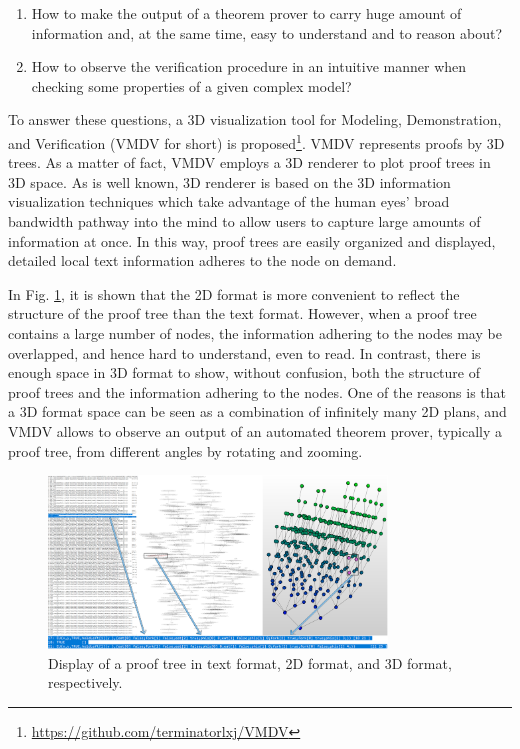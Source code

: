 \documentclass[runningheads]{llncs}
\newcommand\tool[1]{\textsf{#1}}
\newcommand\vmdv{\tool{VMDV}}
\begin{document}
\begin{enumerate}
\item 
How to make the output of a theorem prover to carry huge amount of information and, at the same time,  easy to understand and to reason about?
\item 
How to observe the verification procedure in an intuitive manner when checking some properties of a given complex model?
\end{enumerate}

To answer these questions, 
a 3D visualization tool for Modeling, Demonstration, and Verification (\vmdv{} for short) is proposed\footnote{\url{https://github.com/terminatorlxj/VMDV}}.
\vmdv{} represents proofs by 3D trees.
As a matter of fact, 
\vmdv{} employs a 3D renderer to plot proof trees in 3D space. 
As is well known, 3D renderer is based on the 3D information visualization techniques
which take advantage of the human eyes' broad bandwidth pathway into the mind to allow users to capture large amounts of information at once.
In this way, proof trees are easily organized and displayed,
detailed local text information adheres to the node on demand.

In Fig. \ref{fig:compare_text_graph_detail},
it is shown that the 2D format is more convenient to reflect the structure of the proof tree than the text format.
However, when a proof tree contains a large number of nodes, 
the information adhering to the nodes may be overlapped, and hence hard to understand, even to read.
In contrast, there is enough space in 3D format to show, without confusion, both the structure of proof trees and the information adhering to the nodes. 
One of the reasons is that a 3D format space can be seen as a combination of infinitely many 2D plans, and \vmdv{} allows to
observe an output of an automated theorem prover, typically a proof tree, from different angles by rotating and zooming.

\begin{figure}[!h]
\centering
\includegraphics[width=9cm]{./compare_123.png}
\caption{Display of a proof tree in text format, 2D format, and 3D format, respectively.} 
\label{fig:compare_text_graph_detail}
\end{figure}
\end{document}
